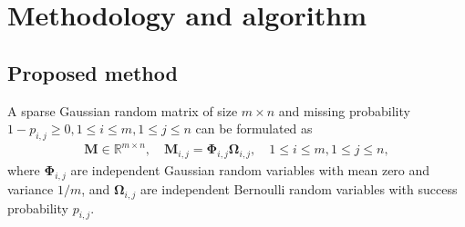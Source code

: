 \documentclass[numsec,webpdf,modern,large,namedate]{oup-authoring-template}
\theoremstyle{plain}
\theoremstyle{remark}
\newcommand{\M}{\bm{M}}
\newcommand{\bOmega}{\bm{\Omega}}
\begin{document}
\section{Methodology and algorithm}
\label{sec:methodology}

\subsection{Proposed method}
A sparse Gaussian random matrix of size $m\times n$ and missing probability $1-p_{i,j} \ge 0, 1\le i\le m, 1\le j\le n$ can be formulated as
\begin{align*}
   \M\in\mathbb{R}^{m\times n}, \quad \M_{i,j} = \bm{\Phi}_{i,j} \bOmega_{i,j},\quad 1\le i\le m,1\le j\le n,
\end{align*}
where $\bm{\Phi}_{i,j}$ are independent Gaussian random variables with mean zero and variance $1/m$, and $\bOmega_{i,j}$ are independent Bernoulli random variables with success probability $p_{i,j}$.
\end{document}
